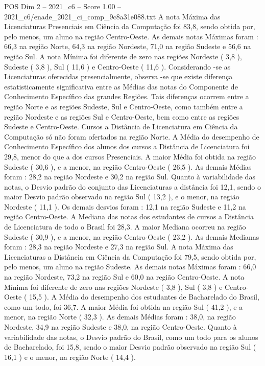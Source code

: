 \begin{textsample}{POS Dim 2 – 2021\_c6 – Score 1.00 – 2021\_c6/enade\_2021\_ci\_comp\_9c8a31e088.txt}
A nota Máxima das Licenciaturas Presenciais em Ciência da Computação foi 83,8, sendo obtida por, pelo menos, um aluno na região Centro-Oeste.
As demais notas Máximas foram : 66,3 na região Norte, 64,3 na região Nordeste, 71,0 na região Sudeste e 56,6 na região Sul.
A nota Mínima foi diferente de zero nas regiões Nordeste ( 3,8 ), Sudeste ( 3,8 ), Sul ( 11,6 ) e Centro-Oeste ( 11,6 ).
Considerando -se as Licenciaturas oferecidas presencialmente, observa -se que existe diferença estatisticamente significativa entre as Médias das notas do Componente de Conhecimento Específico das grandes Regiões.
Tais diferenças ocorrem entre a região Norte e as regiões Sudeste, Sul e Centro-Oeste, como também entre a região Nordeste e as regiões Sul e Centro-Oeste, bem como entre as regiões Sudeste e Centro-Oeste.
Cursos a Distância de Licenciatura em Ciência da Computação só não foram ofertados na região Norte.
A Média do desempenho de Conhecimento Específico dos alunos dos cursos a Distância de Licenciatura foi 29,8, menor do que a dos cursos Presenciais.
A maior Média foi obtida na região Sudeste ( 30,6 ), e a menor, na região Centro-Oeste ( 26,5 ).
As demais Médias foram : 28,2 na região Nordeste e 30,2 na região Sul.
Quanto à variabilidade das notas, o Desvio padrão do conjunto das Licenciaturas a distância foi 12,1, sendo o maior Desvio padrão observado na região Sul ( 13,2 ), e o menor, na região Nordeste ( 11,1 ).
Os demais desvios foram : 12,1 na região Sudeste e 11,2 na região Centro-Oeste.
A Mediana das notas dos estudantes de cursos a Distância de Licenciatura de todo o Brasil foi 28,3.
A maior Mediana ocorreu na região Sudeste ( 30,9 ), e a menor, na região Centro-Oeste ( 23,2 ).
As demais Medianas foram : 28,3 na região Nordeste e 27,3 na região Sul.
A nota Máxima das Licenciaturas a Distância em Ciência da Computação foi 79,5, sendo obtida por, pelo menos, um aluno na região Sudeste.
As demais notas Máximas foram : 66,0 na região Nordeste, 73,2 na região Sul e 60,0 na região Centro-Oeste.
A nota Mínima foi diferente de zero nas regiões Nordeste ( 3,8 ), Sul ( 3,8 ) e Centro-Oeste ( 15,5 ).
A Média do desempenho dos estudantes de Bacharelado do Brasil, como um todo, foi 36,7.
A maior Média foi obtida na região Sul ( 41,2 ), e a menor, na região Norte ( 32,3 ).
As demais Médias foram : 38,0, na região Nordeste, 34,9 na região Sudeste e 38,0, na região Centro-Oeste.
Quanto à variabilidade das notas, o Desvio padrão do Brasil, como um todo para os alunos de Bacharelado, foi 15,8, sendo o maior Desvio padrão observado na região Sul ( 16,1 ) e o menor, na região Norte ( 14,4 ).

\end{textsample}
